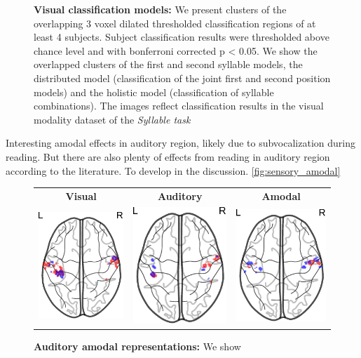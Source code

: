 \begin{figure}[ht]
\vspace{3ex}
\caption{\textbf{Visual classification models:} We present clusters of the overlapping 3 voxel dilated thresholded classification regions of at least 4 subjects. Subject classification results were thresholded above chance level and with bonferroni corrected p < 0.05. We show the overlapped clusters of the first and second syllable models, the distributed model (classification of the joint first and second position models) and the holistic model (classification of syllable combinations). The images reflect classification results in the visual modality dataset of the \emph{Syllable task}}
\label{fig:visual_searchlight}
\end{figure}


Interesting amodal effects in auditory region, likely due to subvocalization during reading. But there are also plenty of effects from reading in auditory region according to the literature. To develop in the discussion.
\ref{fig:sensory_amodal}

\begin{figure}[ht]
\scriptsize
\vspace{5ex}
\hspace{-4ex}
\begin{tabular}{ccc}
\textbf{\Large Visual} & \textbf{\Large Auditory} & \textbf{\Large Amodal}\\
{\includegraphics[width=.18\linewidth]{figures/part_II/searchlight/amodal/auditory_Vis-Vis_segmentation.pdf}}
\hspace{1ex}
&{\includegraphics[width=.18\linewidth]{figures/part_II/searchlight/amodal/auditory_Aud-Aud_segmentation.pdf}}
\hspace{1ex}
&{\includegraphics[width=.18\linewidth]{figures/part_II/searchlight/amodal/auditory_amodal_segmentation.pdf}}
\hspace{1ex}\\
\end{tabular}
\vspace{3ex}
\caption{\textbf{Auditory amodal representations:} We show}
\label{fig:auditory_amodal}
\end{figure}


